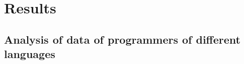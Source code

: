\chapter{Results}\label{ch:results}

\section{Analysis of data of programmers of different languages}
